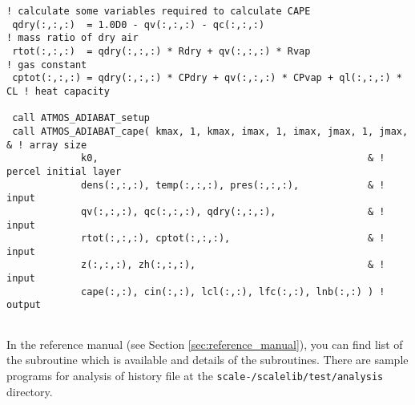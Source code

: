 {  \verb|! calculate some variables required to calculate CAPE|\\
  \verb| qdry(:,:,:)  = 1.0D0 - qv(:,:,:) - qc(:,:,:)                            ! mass ratio of dry air|\\
  \verb| rtot(:,:,:)  = qdry(:,:,:) * Rdry + qv(:,:,:) * Rvap                    ! gas constant|\\
  \verb| cptot(:,:,:) = qdry(:,:,:) * CPdry + qv(:,:,:) * CPvap + ql(:,:,:) * CL ! heat capacity|\\
  \verb|                         |\\
  \verb| call ATMOS_ADIABAT_setup|\\
  \verb| call ATMOS_ADIABAT_cape( kmax, 1, kmax, imax, 1, imax, jmax, 1, jmax,      & ! array size|\\
  \hspace{12em}\verb|             k0,                                               & ! percel initial layer|\\
  \hspace{12em}\verb|             dens(:,:,:), temp(:,:,:), pres(:,:,:),            & ! input|\\
  \hspace{12em}\verb|             qv(:,:,:), qc(:,:,:), qdry(:,:,:),                & ! input|\\
  \hspace{12em}\verb|             rtot(:,:,:), cptot(:,:,:),                        & ! input|\\
  \hspace{12em}\verb|             z(:,:,:), zh(:,:,:),                              & ! input|\\
  \hspace{12em}\verb|             cape(:,:), cin(:,:), lcl(:,:), lfc(:,:), lnb(:,:) ) ! output|\\
  \verb| |\\
}


In the reference manual (see Section \ref{sec:reference_manual}), you can find list of the subroutine which is available and details of the subroutines.
There are sample programs for analysis of \scalerm history file at the \texttt{scale-\version/scalelib/test/analysis} directory.

